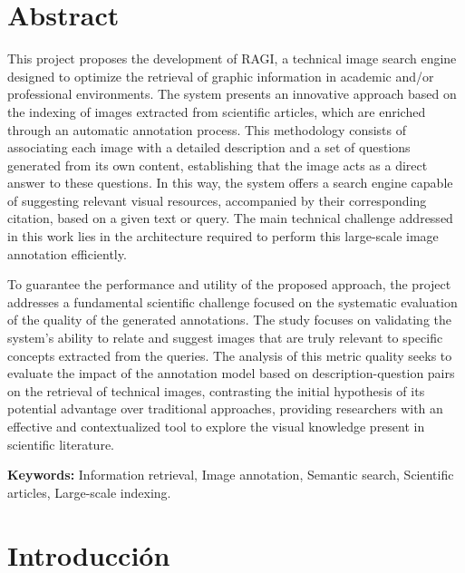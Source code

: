 \documentclass[a4paper]{report}
\begin{document}
\chapter*{Abstract}
This project proposes the development of RAGI, a technical image search engine designed to optimize the retrieval of graphic information in academic and/or professional environments. The system presents an innovative approach based on the indexing of images extracted from scientific articles, which are enriched through an automatic annotation process. This methodology consists of associating each image with a detailed description and a set of questions generated from its own content, establishing that the image acts as a direct answer to these questions. In this way, the system offers a search engine capable of suggesting relevant visual resources, accompanied by their corresponding citation, based on a given text or query. The main technical challenge addressed in this work lies in the architecture required to perform this large-scale image annotation efficiently.

To guarantee the performance and utility of the proposed approach, the project addresses a fundamental scientific challenge focused on the systematic evaluation of the quality of the generated annotations. The study focuses on validating the system's ability to relate and suggest images that are truly relevant to specific concepts extracted from the queries. The analysis of this metric quality seeks to evaluate the impact of the annotation model based on description-question pairs on the retrieval of technical images, contrasting the initial hypothesis of its potential advantage over traditional approaches, providing researchers with an effective and contextualized tool to explore the visual knowledge present in scientific literature.

\textbf{Keywords:} Information retrieval, Image annotation, Semantic search, Scientific articles, Large-scale indexing.

\begingroup
\setlength{\parskip}{0pt}
\tableofcontents
\newpage
\listoftables
\newpage
\listoffigures
\newpage
\endgroup


\chapter{Introducción}
\end{document}

